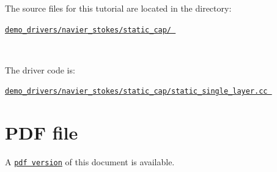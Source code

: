 \begin{DoxyItemize}
\item The source files for this tutorial are located in the directory\+:~\newline
~\newline
\begin{center} \href{../../../../demo_drivers/navier_stokes/static_cap/}{\tt demo\+\_\+drivers/navier\+\_\+stokes/static\+\_\+cap/ } \end{center} ~\newline

\item The driver code is\+: ~\newline
~\newline
\begin{center} \href{../../../../demo_drivers/navier_stokes/static_cap/static_single_layer.cc}{\tt demo\+\_\+drivers/navier\+\_\+stokes/static\+\_\+cap/static\+\_\+single\+\_\+layer.\+cc } \end{center} 
\end{DoxyItemize}

 

 \hypertarget{index_pdf}{}\section{P\+D\+F file}\label{index_pdf}
A \href{../latex/refman.pdf}{\tt pdf version} of this document is available. 
